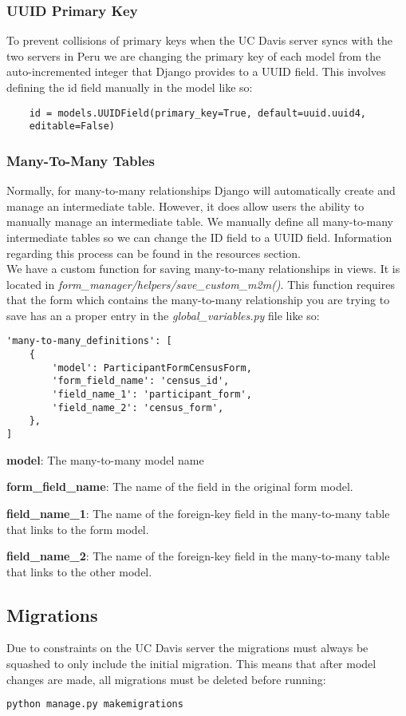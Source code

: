 \documentclass{article}
\begin{document}
\subsubsection{UUID Primary Key}
To prevent collisions of primary keys when the UC Davis server syncs with the two servers in Peru we are changing the primary key of each model from the auto-incremented integer that Django provides to a UUID field. This involves defining the id field manually in the model like so:
\begin{verbatim}
    id = models.UUIDField(primary_key=True, default=uuid.uuid4, 
    editable=False)
\end{verbatim}
\subsubsection{Many-To-Many Tables}
Normally, for many-to-many relationships Django will automatically create and manage an intermediate table. However, it does allow users the ability to manually manage an intermediate table. We manually define all many-to-many intermediate tables so we can change the ID field to a UUID field. Information regarding this process can be found in the resources section.
\\We have a custom function for saving many-to-many relationships in views. It is located in \textit{form\_manager/helpers/save\_custom\_m2m()}. This function requires that the form which contains the many-to-many relationship you are trying to save has an a proper entry in the \textit{global\_variables.py} file like so:
\begin{verbatim}
'many-to-many_definitions': [
    {
        'model': ParticipantFormCensusForm,
        'form_field_name': 'census_id',
        'field_name_1': 'participant_form',
        'field_name_2': 'census_form',
    },
]
\end{verbatim}

\textbf{model}: The many-to-many model name

\textbf{form\_field\_name}: The name of the field in the original form model.

\textbf{field\_name\_1}: The name of the foreign-key field in the many-to-many table that links to the form model.

\textbf{field\_name\_2}: The name of the foreign-key field in the many-to-many table that links to the other model.

\subsection{Migrations}
Due to constraints on the UC Davis server the migrations must always be squashed to only include the initial migration.  This means that after model changes are made, all migrations must be deleted before running:
\begin{lstlisting}[language=bash]
  python manage.py makemigrations
\end{lstlisting}
\end{document}
